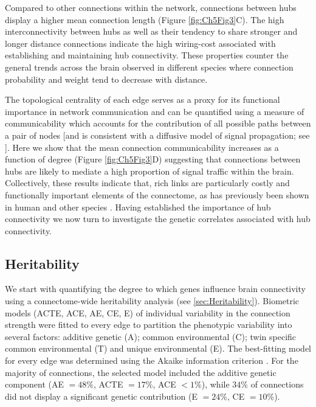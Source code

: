 Compared to other connections within the network, connections between hubs display a higher mean connection length (Figure \ref{fig:Ch5Fig3}C). The high interconnectivity between hubs as well as their tendency to share stronger and longer distance connections indicate the high wiring-cost associated with establishing and maintaining hub connectivity. These properties counter the general trends across the brain observed in different species where connection probability \citep{Arnatkeviciute2018,Fornito2019,Fulcher2016} and weight \citep{Betzel2018} tend to decrease with distance. 

The topological centrality of each edge serves as a proxy for its functional importance in network communication and can be quantified using a measure of communicability which accounts for the contribution of all possible paths between a pair of nodes [and is consistent with a diffusive model of signal propagation; see \citep{Avena-Koenigsberger2017}]. Here we show that the mean connection communicability increases as a function of degree (Figure \ref{fig:Ch5Fig3}D) suggesting that connections between hubs are likely to mediate a high proportion of signal traffic within the brain. Collectively, these results indicate that, rich links are particularly costly and functionally important elements of the connectome, as has previously been shown in human \citep{VandenHeuvel2011} and other species \citep{Arnatkeviciute2018,Fulcher2016,Towlson2013}. Having established the importance of hub connectivity we now turn to investigate the genetic correlates associated with hub connectivity. 

\subsection{Heritability}

We start with quantifying the degree to which genes influence brain connectivity using a connectome-wide heritability analysis (see \ref{sec:Heritability}). Biometric models (ACTE, ACE, AE, CE, E) of individual variability in the connection strength were fitted to every edge to partition the phenotypic variability into several factors: additive genetic (A); common environmental (C); twin specific common environmental (T) and unique environmental (E). The best-fitting model for every edge was determined using the Akaike information criterion \citep{Akaike1998}. For the majority of connections, the selected model included the additive genetic component (AE $= 48\%$, ACTE $= 17\%$, ACE $<1\%$), while $34\%$ of connections did not display a significant genetic contribution (E $= 24\%$, CE $= 10\%$). 

